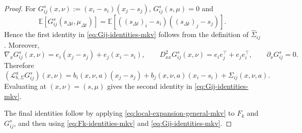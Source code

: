 \documentclass[a4paper, 10pt, english, reqno]{amsart}
\begin{document}
\begin{proof}
For $G_{ij}^s(x,\nu):=(x_i-s_i)(x_j-s_j)$,
$G_{ij}^s(s,\mu)=0$ and
\[
\mathbb E[G_{ij}^s(s_{\Delta t},\mu_{\Delta t})]
=
\mathbb E[
((s_{\Delta t})_i-s_i)((s_{\Delta t})_j-s_j)
].
\]
Hence the first identity in \eqref{eq:Gij-identities-mkv} follows from
the definition of $\hat\Sigma_{ij}$. Moreover,
\[
\nabla_xG_{ij}^s(x,\nu)
=
e_i(x_j-s_j)+e_j(x_i-s_i),
\qquad
D_{xx}^2G_{ij}^s(x,\nu)
=
e_ie_j^\top+e_je_i^\top,
\qquad
\partial_\nu G_{ij}^s=0.
\]
Therefore
\[
(\mathscr L_{b,\Sigma}^aG_{ij}^s)(x,\nu)
=
b_i(x,\nu,a)(x_j-s_j)
+
b_j(x,\nu,a)(x_i-s_i)
+
\Sigma_{ij}(x,\nu,a).
\]
Evaluating at $(x,\nu)=(s,\mu)$ gives the second identity in
\eqref{eq:Gij-identities-mkv}.

The final identities follow by applying
\eqref{eq:local-expansion-general-mkv} to $F_k$ and $G_{ij}^s$, and
then using \eqref{eq:Fk-identities-mkv} and
\eqref{eq:Gij-identities-mkv}.
\end{proof}
\end{document}
